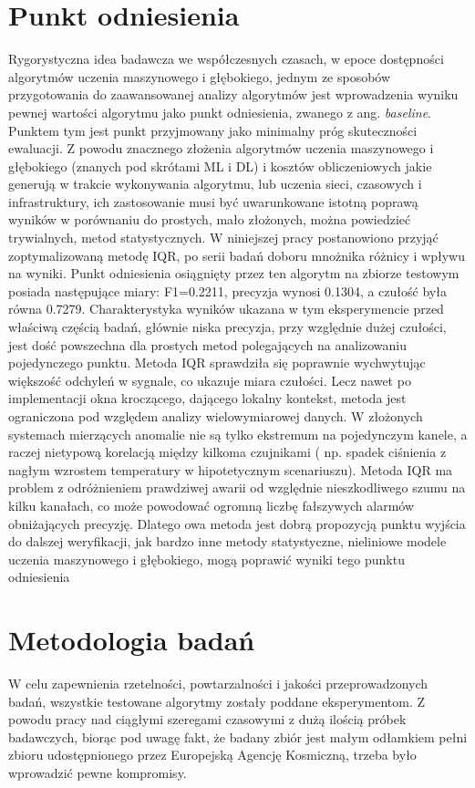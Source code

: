\documentclass[a4paper,twoside,12pt]{book}
\newcommand{\obcy}[1]{\emph{#1}}
\newcommand{\english}[1]{{\selectlanguage{british}\obcy{#1}}}
\begin{document}
	\section{Punkt odniesienia}
	
	Rygorystyczna idea badawcza we współczesnych czasach, w epoce dostępności algorytmów uczenia maszynowego i głębokiego, jednym ze sposobów przygotowania do zaawansowanej analizy algorytmów jest wprowadzenia wyniku pewnej wartości algorytmu jako punkt odniesienia, zwanego z ang. \english{baseline}. Punktem tym jest punkt przyjmowany jako minimalny próg skuteczności ewaluacji. Z powodu znacznego złożenia algorytmów uczenia maszynowego i głębokiego (znanych pod skrótami ML i DL) i kosztów obliczeniowych jakie generują w trakcie wykonywania algorytmu, lub uczenia sieci, czasowych i infrastruktury, ich zastosowanie musi być uwarunkowane istotną poprawą wyników w porównaniu do prostych, mało złożonych, można powiedzieć trywialnych, metod statystycznych. 
	W niniejszej pracy postanowiono przyjąć zoptymalizowaną metodę IQR, po serii badań doboru mnożnika różnicy i wpływu na wyniki. Punkt odniesienia osiągnięty przez ten algorytm na zbiorze testowym posiada następujące miary: F1=0.2211, precyzja wynosi 0.1304, a czułość była równa 0.7279.
	Charakterystyka wyników ukazana w tym eksperymencie przed właściwą częścią badań, głównie niska precyzja, przy względnie dużej czułości, jest dość powszechna dla prostych metod polegających na analizowaniu pojedynczego punktu. Metoda IQR sprawdziła się poprawnie wychwytując większość odchyleń w sygnale, co ukazuje miara czułości. Lecz nawet po implementacji okna kroczącego, dającego lokalny kontekst, metoda jest ograniczona pod względem analizy wielowymiarowej danych. W złożonych systemach mierzących anomalie nie są tylko ekstremum na pojedynczym kanele, a raczej nietypową korelacją między kilkoma czujnikami ( np. spadek ciśnienia z nagłym wzrostem temperatury w hipotetycznym scenariuszu). Metoda IQR ma problem z odróżnieniem prawdziwej awarii od względnie nieszkodliwego szumu na kilku kanałach, co może powodować ogromną liczbę fałszywych alarmów obniżających precyzję. Dlatego owa metoda jest dobrą propozycją punktu wyjścia do dalszej weryfikacji, jak bardzo inne metody statystyczne, nieliniowe modele uczenia maszynowego i głębokiego, mogą poprawić wyniki tego punktu odniesienia 
	
	
	\section{Metodologia badań}
	W celu zapewnienia rzetelności, powtarzalności i jakości przeprowadzonych badań, wszystkie testowane algorytmy zostały poddane eksperymentom. Z powodu pracy nad ciągłymi szeregami czasowymi z dużą ilością próbek badawczych, biorąc pod uwagę fakt, że badany zbiór jest małym odłamkiem pełni zbioru udostępnionego przez Europejską Agencję Kosmiczną, trzeba było wprowadzić pewne kompromisy. 
	
\end{document}
